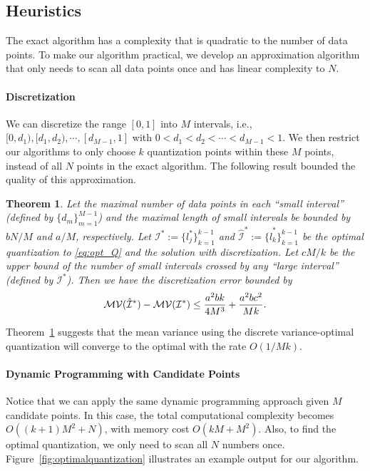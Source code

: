 \documentclass{article}
\newtheorem{theorem}{Theorem}
\begin{document}
\vspace{-0.5em}
\subsection{Heuristics}
\vspace{-0.5em}

The exact algorithm has a complexity that is quadratic to the number of data points. To make our algorithm practical,
we develop an approximation algorithm that only needs to scan all data points once and has linear complexity to $N$.

\vspace{-0.5em}
\paragraph*{Discretization}

We can discretize the range $[0,1]$ into $M$ intervals, i.e., $[0,d_1), [d_1, d_2), \cdots, [d_{M-1}, 1]$ with $0< d_1<d_2<\cdots < d_{M-1}<1$. We then restrict our algorithms to only choose $k$ quantization points within these $M$ points, instead of all $N$ points in the exact algorithm. The following result bounded the quality of this approximation.

\begin{theorem} \label{thm:optQ}
Let the maximal number of data points in each ``small interval'' (defined by $\{d_m\}_{m=1}^{M-1}$) and the maximal length of small intervals be bounded by $bN/M$ and $a/M$, respectively. Let ${\mathcal{I}^*} := \{l^*_j\}_{k=1}^{k-1}$ and $\hat{\mathcal{I}}^* :=\{\hat{l}^*_k\}_{k=1}^{k-1}$ be the optimal quantization to \eqref{eq:opt_Q} and the solution with discretization. Let $cM/k$ be the upper bound of the number of small intervals crossed by any ``large interval'' (defined by ${\mathcal{I}}^*$). Then we have the discretization error bounded by
\vspace{-0.5em}
\[
 \mathcal{MV}(\hat{\mathcal{I}}^*) -  \mathcal{MV}({\mathcal{I}}^*) \leq {a^2b k \over 4 M^3} + {a^2bc^2 \over Mk}.
\]
\end{theorem}

\vspace{-0.5em}
Theorem~\ref{thm:optQ} suggests that the mean variance using the discrete variance-optimal quantization will converge to the optimal with the rate $O(1/Mk)$.

\vspace{-0.5em}
\paragraph*{Dynamic Programming with Candidate Points}
Notice that we can apply the same dynamic programming approach given $M$ candidate points. 
In this case, the total computational complexity becomes $O((k+1)M^2 + N)$, with memory cost 
$O(kM + M^2)$. Also, to find the optimal quantization,  we only need to scan all $N$ numbers once.
Figure~\ref{fig:optimalquantization} illustrates an example output for our algorithm.
\end{document}
